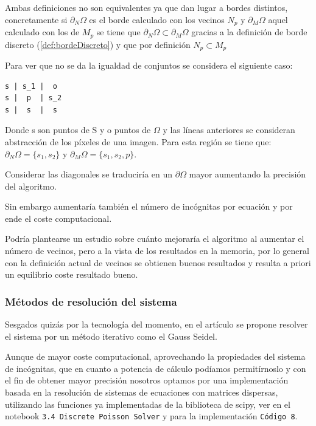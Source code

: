 \documentclass[11pt,twoside,titlepage,a4paper]{article}
\numberwithin{equation}{section} %
\theoremstyle{usual}
\begin{document}
Ambas definiciones no son equivalentes ya que dan lugar a bordes distintos, concretamente si $\partial_N \Omega$ es el borde calculado con los vecinos $N_p$ y $\partial_M \Omega$ aquel calculado con los de $M_p$ se tiene que $\partial_N \Omega \subset \partial_M \Omega$ gracias a la definición de borde discreto (\ref{def:bordeDiscreto}) y que por definición $N_p \subset M_p$

Para ver que no se da la igualdad de conjuntos se considera el siguiente caso: 

\begin{verbatim}
s | s_1 |  o 
s |  p  | s_2
s |  s  |  s 
\end{verbatim}

Donde  s son  puntos de S y o puntos de $\Omega$ y las líneas anteriores se consideran abstracción de los píxeles de una imagen. 
Para esta región se tiene que:
$\partial_N \Omega = \{ s_1, s_2\}$ y $\partial_M \Omega = \{ s_1, s_2, p\}$. 


Considerar las diagonales se traduciría en un $\partial \Omega$ mayor aumentando la precisión del algoritmo. 

Sin embargo aumentaría también  el número de incógnitas por ecuación y por ende el coste computacional.  

Podría plantearse un estudio sobre cuánto mejoraría el algoritmo al aumentar el número de vecinos, pero a la vista de los resultados en la memoria, por lo general con la definición actual de vecinos se obtienen buenos resultados y resulta a priori un equilibrio coste resultado bueno.  


\subsubsection{Métodos de resolución del sistema} \label{subsubresoluciondelsistema}

Sesgados quizás por la tecnología del momento, en el artículo se propone resolver el sistema por un método iterativo como el Gauss Seidel. 

Aunque de mayor coste computacional, aprovechando la propiedades del sistema de incógnitas, que en cuanto a potencia de cálculo podíamos permitírnoslo y con el fin de obtener mayor precisión  nosotros optamos por una implementación basada en la resolución de sistemas de ecuaciones con matrices dispersas, utilizando las funciones ya implementadas de  la biblioteca de scipy, ver en el notebook \texttt{3.4 Discrete Poisson Solver} y para la implementación \texttt{Código 8}. 
\end{document}
